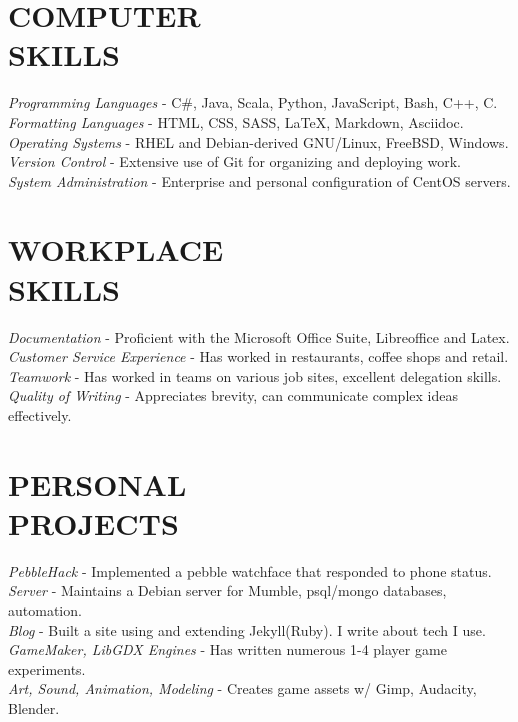 \documentclass[margin]{res}
\begin{document}
\begin{resume}
\section{COMPUTER \\ SKILLS} 
{\sl Programming Languages} - C\#, Java, Scala, Python, JavaScript, Bash, C++, C.\\
{\sl Formatting Languages} - HTML, CSS, SASS, LaTeX, Markdown, Asciidoc.\\
{\sl Operating Systems} - RHEL and Debian-derived GNU/Linux, FreeBSD, Windows. \\
{\sl Version Control} - Extensive use of Git for organizing and deploying work. \\
{\sl System Administration } - Enterprise and personal configuration of CentOS servers.
                 
\section{WORKPLACE \\ SKILLS} 
 {\sl Documentation} - Proficient with the Microsoft Office Suite, Libreoffice and Latex.\\
{\sl Customer Service Experience} - Has worked in restaurants, coffee shops and retail.\\
{\sl Teamwork} - Has worked in teams on various job sites, excellent delegation skills.\\
{\sl Quality of Writing} - Appreciates brevity, can communicate complex ideas effectively.\\



\section{PERSONAL \\ PROJECTS}
{\sl PebbleHack} - Implemented a pebble watchface that responded to phone status.\\
{\sl Server} - Maintains a Debian server for Mumble, psql/mongo databases, automation.\\   
{\sl Blog} - Built a site using and extending Jekyll(Ruby). I write about tech I use.\\  
{\sl GameMaker, LibGDX Engines} - Has written numerous 1-4 player game experiments.\\
{\sl Art, Sound, Animation, Modeling} - Creates game assets w/ Gimp, Audacity, Blender.\\


\end{resume}
\end{document}
